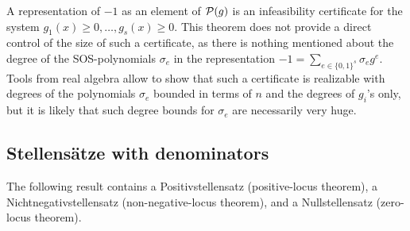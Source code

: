 \begin{remark}
	A representation of $-1$ as an element of $\mathcal{P}(g)$ is an infeasibility certificate for the system $g_1(x) \ge 0,\ldots,g_s(x) \ge 0$. This theorem does not provide a direct control of the size of such a certificate, as there is nothing mentioned about the degree of the SOS-polynomials $\sigma_e$ in the representation $-1 = \sum_{e \in \{0,1\}^s} \sigma_e g^e$. Tools from real algebra allow to show that such a certificate is realizable with degrees of the polynomials $\sigma_e$ bounded in terms of $n$ and the degrees of $g_i$'s only, but it is likely that such degree bounds for $\sigma_e$ are necessarily very huge. 
\end{remark}


\subsection{Stellensätze with denominators}

The following result contains a Positivstellensatz (positive-locus theorem), a Nichtnegativstellensatz (non-negative-locus theorem), and a Nullstellensatz (zero-locus theorem). 

